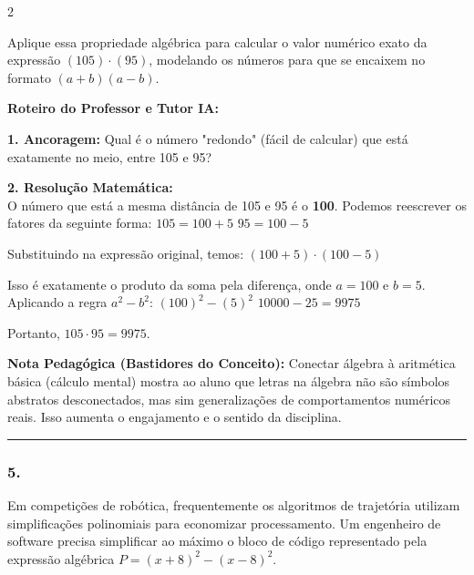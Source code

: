\begin{multicols*}{2}
\begin{enunciadoLiteral}
Aplique essa propriedade algébrica para calcular o valor numérico exato da expressão $ (105) \cdot (95) $, modelando os números para que se encaixem no formato $ (a + b)(a - b) $.
\end{enunciadoLiteral}

\ifgabarito
    \begin{tcolorbox}[colback=CorTitUm!5, colframe=CorTitUm, boxrule=1pt, arc=4pt, left=6pt, right=6pt, top=6pt, bottom=6pt]
    \small\textbf{\textcolor{CorTitUm}{Roteiro do Professor e Tutor IA:}}\par\vspace{0.1cm}
    \color{CinzaEscuro}
    \textbf{1. Ancoragem:} Qual é o número "redondo" (fácil de calcular) que está exatamente no meio, entre 105 e 95?\par\vspace{0.1cm}
    \textbf{2. Resolução Matemática:}\\
    O número que está a mesma distância de 105 e 95 é o \textbf{100}.
    Podemos reescrever os fatores da seguinte forma:
    $ 105 = 100 + 5 $
    $ 95 = 100 - 5 $
    
    Substituindo na expressão original, temos:
    $ (100 + 5) \cdot (100 - 5) $
    
    Isso é exatamente o produto da soma pela diferença, onde $ a = 100 $ e $ b = 5 $. Aplicando a regra $ a^2 - b^2 $:
    $ (100)^2 - (5)^2 $
    $ 10000 - 25 = 9975 $
    
    Portanto, $ 105 \cdot 95 = 9975 $.
    \end{tcolorbox}
    \vspace{0.15cm}
    
    \begin{boxexplicacao}
    \textbf{Nota Pedagógica (Bastidores do Conceito):} Conectar álgebra à aritmética básica (cálculo mental) mostra ao aluno que letras na álgebra não são símbolos abstratos desconectados, mas sim generalizações de comportamentos numéricos reais. Isso aumenta o engajamento e o sentido da disciplina.
    \end{boxexplicacao}
\fi

\par\vspace{\espacoQuestao}

\noindent\textcolor{CorLinha}{\rule{\linewidth}{0.5pt}} 
\par\vspace{\espacoPreQuestao}
\subsubsection*{5.} 
\begin{enunciadoLiteral}
Em competições de robótica, frequentemente os algoritmos de trajetória utilizam simplificações polinomiais para economizar processamento. Um engenheiro de software precisa simplificar ao máximo o bloco de código representado pela expressão algébrica $ P = (x + 8)^2 - (x - 8)^2 $. 


\end{enunciadoLiteral}
\end{multicols*}
